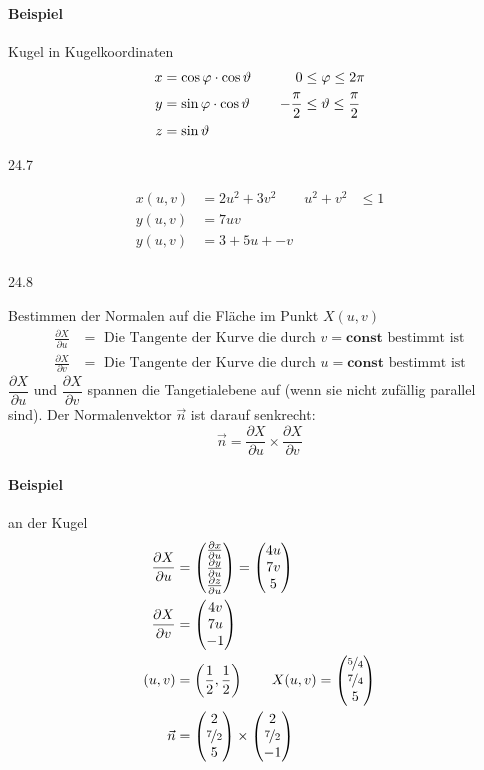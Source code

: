 \paragraph*{Beispiel} Kugel in Kugelkoordinaten
\begin{align*}
 x &= \cos \varphi \cdot \cos \vartheta & \vline && 0 &\le \varphi \le 2\pi\\
 y &= \sin \varphi \cdot \cos \vartheta & \vline && -\frac{\pi}{2} &\le \vartheta \le \frac{\pi}{2}\\
 z &= \sin \vartheta & \vline &&
\end{align*}
\begin{center}
 24.7
\end{center}
\begin{align*}
 x(u,v) &= 2 u^2 + 3 v^2 &
 u^2 + v^2 & \le 1 \\
 y(u,v) &= 7uv\\
 y(u,v) &= 3 + 5 u + - v\\
\end{align*}
\begin{center}
  24.8
\end{center}

Bestimmen der Normalen auf die Fläche im Punkt $X(u,v)$
\begin{align*}
	\frac{\partial X}{\partial u} &= \text{ Die Tangente der Kurve die durch $v = \mathbf{const}$ bestimmt ist}\\
	\frac{\partial X}{\partial v} &= \text{ Die Tangente der Kurve die durch $u = \mathbf{const}$ bestimmt ist}
\end{align*}
$\dfrac{\partial X}{\partial u}$ und $\dfrac{\partial X}{\partial v}$ spannen die Tangetialebene auf (wenn sie nicht
	zufällig parallel sind). Der Normalenvektor $\vec n$ ist darauf senkrecht:
	\[\vec n = \dfrac{\partial X}{\partial u} \times \dfrac{\partial X}{\partial v}\]
\paragraph*{Beispiel} an der Kugel
\begin{align*}
 \frac{\partial X}{\partial u} &= \begin{pmatrix}\frac{\partial x}{\partial u}\\\frac{\partial y}{\partial u}\\\frac{\partial z}{\partial u}\end{pmatrix} = \begin{pmatrix}4u\\7v\\5\end{pmatrix}\\
 \frac{\partial X}{\partial v} &= \begin{pmatrix}4v\\7u\\-1\end{pmatrix}\\
 (u,v) &= \left(\frac{1}{2}, \frac{1}{2}\right) \qquad X(u,v) = \begin{pmatrix}\nicefrac{5}{4}\\\nicefrac{7}{4}\\5\end{pmatrix}\\
 \vec n &= \begin{pmatrix}2\\\nicefrac{7}{2}\\5\end{pmatrix} \times \begin{pmatrix}2\\\nicefrac{7}{2}\\-1\end{pmatrix}
\end{align*}

